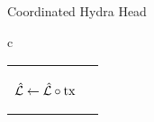 \begin{figure*}[t!]
\begin{algobox}{Coordinated Hydra Head}
\begin{tabular}{c}
\begin{tabular}{c@{}c}
{\begin{walgo}{0.65}
{              $\hat {\mathcal L} \gets \hat {\mathcal L}\circ\mathrm{tx}$ %

            \If{
                \Req $\hpLdr(\bars + 1) = i$ %
                and $\hats = \bars$ \;
                \Multi $(\hpRS,\bars+1,\hatmT\hpProjH)$ \; %
                }
            
          }

          \vspace{12pt} %

          \On{$(\hpRS,s,T)$ %
            from $\party_j$}{ %

            \Req $s = \hats + 1$ %
            and $\hpLdr(s) = j$ \; %

            \Wait{$\bars = \hats$ %
              and $\barmU\applytx T \not= \bot$ %
            }{ %
               $\hats \gets \bars + 1$ \; %

               $\forall\tx\in\Reach^{\mT}(T)$:
                \Out $(\hpSeen,\tx)$ \; %
              
               $\hatmU \gets
               \Sno(\hats,\barmU\applytx T )$ \; %

               $\msSig_i \gets %
               \msSign(\hyPr, (\hats \| U_{0}.h) \| \hatmU.h)$ \; %
 
               \Send $(\hpAS,\hats,\msSig_i)$ %
               to $\party_j$ \; %

                 $\hatmT :\subseteq_{\mbox{max}} \mT$ s.t. $\hatmU\applytx\hatmT\not=\bot$ \; %
                 $\hatmL \gets \hatmU\applytx\hatmT$
            }
           }
          
        \end{walgo}
        }
        &

        \adjustbox{valign=t,scale=\sfact}{
        \begin{walgo}{0.6}
          \On{$(\hpAS,s,\msSig_j)$ %
            from $\party_j$}{ %

            \Req $s \in \{\hats,\hats+1\}$ \; %

            \Wait{$\hats=s$
            }{ %
            
            \Req $\hatmU.\hpSigs[j] = \undefined$ \; %

            $\hatmU.\hpSigs[j] \gets \msSig_j$ \; %

            \If{$\forall k: \hatmU.\hpSigs[k] \neq \undefined$}{ %
              $\msCSig %
              \gets \msComb((s \| U_{0}.h) \| \hatmU.\hash, %
              \msVKL, \hatmU.\hpSigs)$ \; %
              
}}}
\end{walgo}}
\end{tabular}
\end{tabular}
\end{algobox}
\end{figure*}
